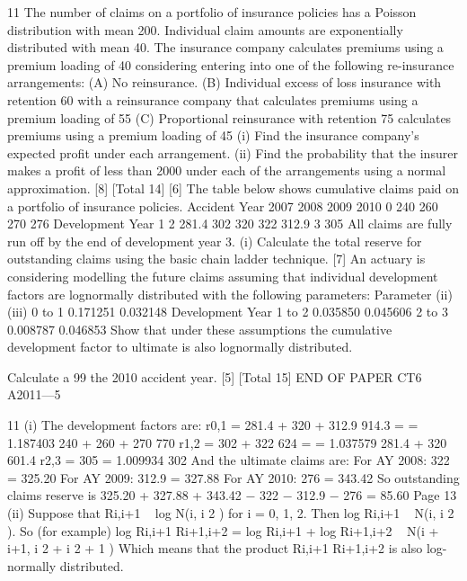 \documentclass[a4paper,12pt]{article}
\begin{document}
11
The number of claims on a portfolio of insurance policies has a Poisson distribution
with mean 200. Individual claim amounts are exponentially distributed with mean 40.
The insurance company calculates premiums using a premium loading of 40%
considering entering into one of the following re-insurance arrangements:
(A) No reinsurance.
(B) Individual excess of loss insurance with retention 60 with a reinsurance
company that calculates premiums using a premium loading of 55%
(C) Proportional reinsurance with retention 75%
calculates premiums using a premium loading of 45%
(i) Find the insurance company’s expected profit under each arrangement.
(ii) Find the probability that the insurer makes a profit of less than 2000 under
each of the arrangements using a normal approximation.
[8]
[Total 14]
[6]
The table below shows cumulative claims paid on a portfolio of insurance policies.
Accident Year
2007
2008
2009
2010
0
240
260
270
276
Development Year
1
2
281.4
302
320
322
312.9
3
305
All claims are fully run off by the end of development year 3.
(i)
Calculate the total reserve for outstanding claims using the basic chain ladder
technique.
[7]
An actuary is considering modelling the future claims assuming that individual
development factors are lognormally distributed with the following parameters:
Parameter
\mu 
\sigma
(ii)
(iii)
0 to 1
0.171251
0.032148
Development Year
1 to 2
0.035850
0.045606
2 to 3
0.008787
0.046853
Show that under these assumptions the cumulative development factor to
ultimate is also lognormally distributed.

Calculate a 99%
the 2010 accident year.
[5]
[Total 15]
END OF PAPER
CT6 A2011—5



11
(i)
The development factors are:
r0,1 = 281.4 + 320 + 312.9 914.3
=
= 1.187403
240 + 260 + 270
770
r1,2 = 302 + 322
624
=
= 1.037579
281.4 + 320 601.4
r2,3 = 305
= 1.009934
302
And the ultimate claims are:
For AY 2008: 322  = 325.20
For AY 2009: 312.9   = 327.88
For AY 2010: 276    = 343.42
So outstanding claims reserve is
325.20 + 327.88 + 343.42 − 322 − 312.9 − 276 = 85.60
Page 13%
(ii)
Suppose that Ri,i+1 ~ log N(\mu i, \sigma i 2 ) for i = 0, 1, 2.
Then log Ri,i+1 ~ N(\mu i, \sigma i 2 ).
So (for example)
log Ri,i+1 Ri+1,i+2 = log Ri,i+1 + log Ri+1,i+2 ~ N(\mu i + \mu i+1, \sigma i 2 + \sigma i 2 + 1 )
Which means that the product Ri,i+1 Ri+1,i+2 is also log-normally distributed.
\end{document}
